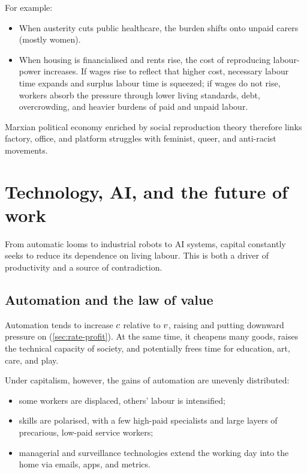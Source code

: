 For example:

\begin{itemize}[leftmargin=1.5em]
  \item When austerity cuts public healthcare, the burden shifts onto unpaid carers (mostly women).
  \item When housing is financialised and rents rise, the cost of reproducing labour-power increases. If wages rise to reflect that higher cost, necessary labour time expands and surplus labour time is squeezed; if wages do not rise, workers absorb the pressure through lower living standards, debt, overcrowding, and heavier burdens of paid and unpaid labour.
\end{itemize}

Marxian political economy enriched by social reproduction theory therefore
links factory, office, and platform struggles with feminist, queer, and
anti-racist movements.\cite{BhattacharyaSRT}

\section{Technology, AI, and the future of work}
\label{sec:technology-ai}

From automatic looms to industrial robots to AI systems, capital constantly
seeks to reduce its dependence on living labour. This is both a driver of
productivity and a source of contradiction.

\subsection{Automation and the law of value}

Automation tends to increase $c$ relative to $v$, raising \OCC{}
and putting downward pressure on \profitrate{} (\cref{sec:rate-profit}). At
the same time, it cheapens many goods, raises the technical capacity of
society, and potentially frees time for education, art, care, and play.

Under capitalism, however, the gains of automation are unevenly distributed:

\begin{itemize}[leftmargin=1.5em]
  \item some workers are displaced, others' labour is intensified;
  \item skills are polarised, with a few high-paid specialists and large layers of
  precarious, low-paid service workers;
  \item managerial and surveillance technologies extend the working day into
  the home via emails, apps, and metrics.
\end{itemize}

